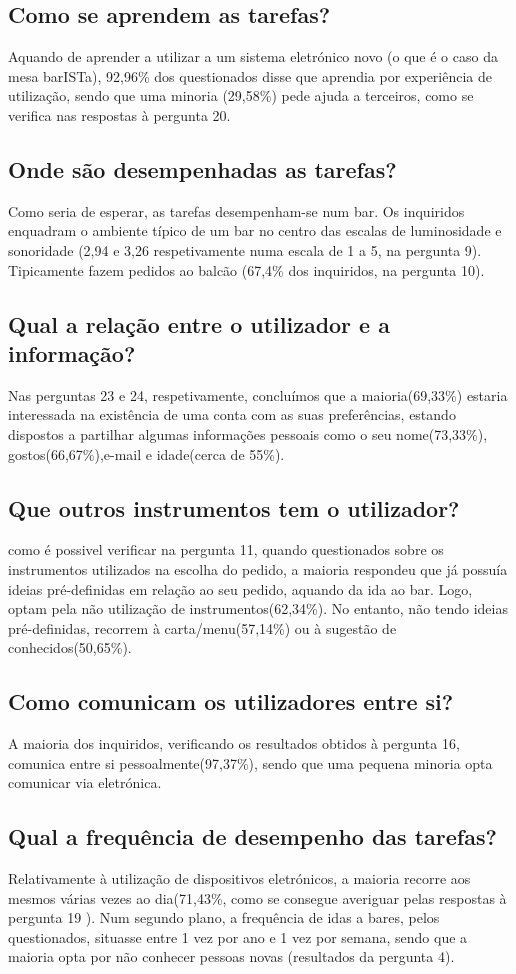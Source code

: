 \documentclass{article}
\begin{document}
\subsection*{Como se aprendem as tarefas?}
Aquando de aprender a utilizar a um sistema eletrónico novo (o que é o caso da mesa barISTa), 92,96\% dos questionados disse que aprendia por experiência de utilização, sendo que uma minoria (29,58\%) pede ajuda a terceiros, como se verifica nas respostas à pergunta 20.
\subsection*{Onde são desempenhadas as tarefas?}
Como seria de esperar, as tarefas desempenham-se num bar. Os inquiridos enquadram o ambiente típico de um bar no centro das escalas de luminosidade e sonoridade (2,94 e 3,26 respetivamente numa escala de 1 a 5, na pergunta 9). Tipicamente fazem pedidos ao balcão (67,4\% dos inquiridos, na pergunta 10).
\subsection*{Qual a relação entre o utilizador e a informação?}
Nas perguntas 23 e 24, respetivamente, concluímos que a maioria(69,33\%) estaria interessada na existência de uma conta com as suas preferências, estando dispostos a partilhar algumas informações pessoais como o seu nome(73,33\%), gostos(66,67\%),e-mail e idade(cerca de 55\%).
\subsection*{Que outros instrumentos tem o utilizador?}
como é possivel verificar na pergunta 11, quando questionados sobre os instrumentos utilizados na escolha do pedido, a maioria respondeu que já possuía ideias pré-definidas em relação ao seu pedido, aquando da ida ao bar. Logo, optam pela não utilização de instrumentos(62,34\%). No entanto, não tendo ideias pré-definidas, recorrem à carta/menu(57,14\%) ou à sugestão de conhecidos(50,65\%).
\subsection*{Como comunicam os utilizadores entre si?}
A maioria dos inquiridos, verificando os resultados obtidos à pergunta 16, comunica entre si pessoalmente(97,37\%), sendo que uma pequena minoria opta comunicar via eletrónica.
\subsection*{Qual a frequência de desempenho das tarefas?}
Relativamente à utilização de dispositivos eletrónicos, a maioria recorre aos mesmos várias vezes ao dia(71,43\%, como se consegue averiguar pelas respostas à pergunta 19 ).
Num segundo plano, a frequência de idas a bares, pelos questionados, situasse entre 1 vez por ano e 1 vez por semana, sendo que a maioria opta por não conhecer pessoas novas (resultados da pergunta 4).
\end{document}
